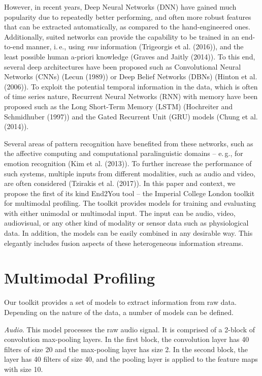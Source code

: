 \documentclass[twoside,11pt]{article}
\begin{document}
However, in recent years, Deep Neural Networks (DNN) have gained much popularity due to repeatedly better performing, and often more robust features that can be extracted automatically, as compared to the hand-engineered ones. Additionally, suited networks can provide the capability to be trained in an end-to-end manner, i.\,e., using \textit{raw} information (Trigeorgis et al. (2016)), and the least possible human a-priori knowledge (Graves and Jaitly (2014)). To this end, several deep architectures have been proposed such as Convolutional Neural Networks (CNNs)  (Lecun (1989)) or Deep Belief Networks (DBNs) (Hinton et al. (2006)). To exploit the potential temporal information in the data, which is often of time series nature,  Recurrent Neural Networks (RNN) with memory have been proposed such as the Long Short-Term Memory (LSTM)  (Hochreiter and Schmidhuber (1997)) and the Gated Recurrent Unit (GRU) models  (Chung et al. (2014)).

Several areas of pattern recognition have benefited from these networks, such as the affective computing and computational paralinguistic domains -- e.\,g., for emotion recognition (Kim et al. (2013)). To further increase the performance of such systems, multiple inputs from different modalities, such as audio and video, are often considered  (Tzirakis et al. (2017)). In this paper and context, we propose the first of its kind End2You tool -- the Imperial College London toolkit for multimodal profiling. The toolkit provides models for training and evaluating with either unimodal or multimodal input. The input can be audio, video, audiovisual, or any other kind of modality or sensor data such as physiological data. In addition, the models can be easily combined in any desirable way. This elegantly includes fusion aspects of these heterogeneous information streams.

\section{Multimodal Profiling}

Our toolkit provides a set of models to extract information from raw data. Depending on the nature of the data, a number of models can be defined.

\textit{Audio}. This model processes the raw audio signal. It is comprised of a 2-block of convolution max-pooling layers. In the first block, the convolution layer has 40 filters of size 20 and the max-pooling layer has size 2. In the second block, the layer has 40 filters of size 40, and the pooling layer is applied to the feature maps with size 10.
\end{document}
